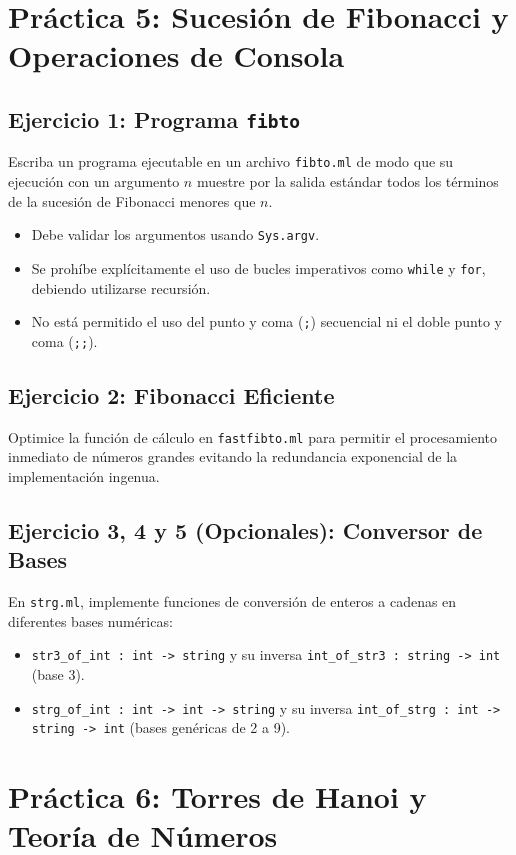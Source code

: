 \documentclass[11pt,a4paper]{article}
\begin{document}
\section{Práctica 5: Sucesión de Fibonacci y Operaciones de Consola}
\subsection{Ejercicio 1: Programa \texttt{fibto}}
Escriba un programa ejecutable en un archivo \texttt{fibto.ml} de modo que su ejecución con un argumento $n$ muestre por la salida estándar todos los términos de la sucesión de Fibonacci menores que $n$.
\begin{itemize}
    \item Debe validar los argumentos usando \texttt{Sys.argv}.
    \item Se prohíbe explícitamente el uso de bucles imperativos como \texttt{while} y \texttt{for}, debiendo utilizarse recursión.
    \item No está permitido el uso del punto y coma (\texttt{;}) secuencial ni el doble punto y coma (\texttt{;;}).
\end{itemize}

\subsection{Ejercicio 2: Fibonacci Eficiente}
Optimice la función de cálculo en \texttt{fastfibto.ml} para permitir el procesamiento inmediato de números grandes evitando la redundancia exponencial de la implementación ingenua.

\subsection{Ejercicio 3, 4 y 5 (Opcionales): Conversor de Bases}
En \texttt{strg.ml}, implemente funciones de conversión de enteros a cadenas en diferentes bases numéricas:
\begin{itemize}
    \item \texttt{str3\_of\_int : int -> string} y su inversa \texttt{int\_of\_str3 : string -> int} (base 3).
    \item \texttt{strg\_of\_int : int -> int -> string} y su inversa \texttt{int\_of\_strg : int -> string -> int} (bases genéricas de 2 a 9).
\end{itemize}


\section{Práctica 6: Torres de Hanoi y Teoría de Números}
\end{document}
